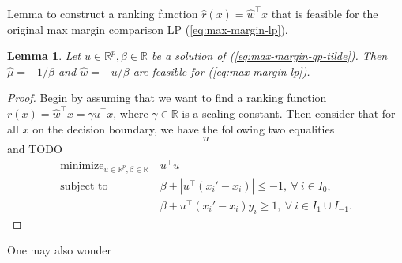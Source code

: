 \documentclass{article}
\newtheorem{lemma}{Lemma}
\newcommand{\RR}{\mathbb R}
\DeclareMathOperator*{\minimize}{minimize}
\begin{document}
Lemma to construct a ranking function $\hat r(x)= \hat w^\intercal x$
that is feasible for the original max margin comparison LP
(\ref{eq:max-margin-lp}).
\begin{lemma}
  Let $u\in\RR^p,\beta\in\RR$ be a solution of
  (\ref{eq:max-margin-qp-tilde}). Then $\hat \mu = -1/\beta$
  and $\hat w = -u/\beta$ are feasible for
  (\ref{eq:max-margin-lp}).
  \label{lemma:feasible}
\end{lemma}
\begin{proof}
  Begin by assuming that we want to find a ranking function $r(x)=\hat
  w^\intercal x = \gamma u^\intercal x$, where $\gamma\in\RR$ is a
  scaling constant.  Then consider that for all $x$ on the decision
  boundary, we have the following two equalities
  \begin{equation}
    \label{eq:dec-boundary-rank}
    u
  \end{equation}
and TODO
\begin{equation}
  \label{eq:max-margin-qp}
  \begin{aligned}
    \minimize_{u\in\RR^p, \beta\in\RR}\ & u^\intercal u  \\
    \text{subject to}\ & \beta + |u^\intercal (x_i'-x_i)| \leq -1,\
    \forall\  i\in I_0,\\
    & \beta + u^\intercal(x_i'-x_i)y_i \geq 1,\ \forall\ i\in I_1\cup I_{-1}.
  \end{aligned}
\end{equation}
\end{proof}


One may also wonder 
\end{document}
